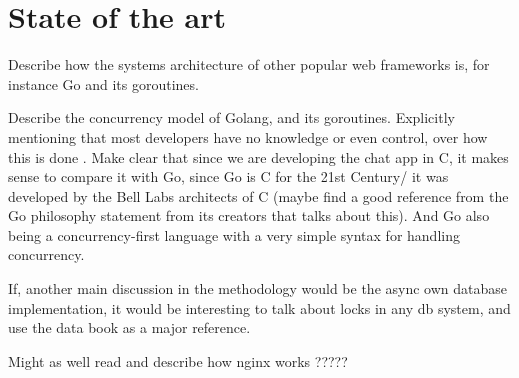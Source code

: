 \section{State of the art}
Describe how the systems architecture of other popular web frameworks is, for instance Go and its goroutines.

Describe the concurrency model of Golang, and its goroutines. Explicitly mentioning that most developers have no knowledge or even control, over how this is done \cite{Cox-Buday2017}. Make clear that since we are developing the chat app in C, it makes sense to compare it with Go, since Go is C for the 21st Century/ it was developed by the Bell Labs architects of C (maybe find a good reference from the Go philosophy statement from its creators that talks about this). And Go also being a concurrency-first language with a very simple syntax for handling concurrency.

If, another main discussion in the methodology would be the async own database implementation, it would be interesting to talk about locks in any db system, and use the data book as a major reference.

Might as well read and describe how nginx works ?????
